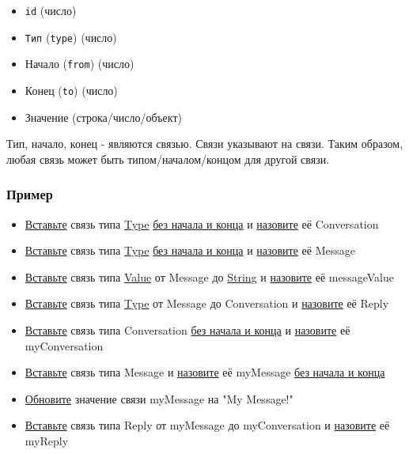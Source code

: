 \documentclass{article}
\begin{document}
\begin{itemize}
      \item \texttt{id} (число)
      \item \texttt{Тип} (\texttt{type}) (число)
      \item Начало (\texttt{from}) (число)
      \item Конец (\texttt{to}) (число)
      \item Значение (строка/число/объект)
\end{itemize}

Тип, начало, конец - являются связью. Связи указывают на связи. Таким образом,
любая связь может быть типом/началом/концом для другой связи.

\subsubsection{Пример}
\begin{itemize}
      \item \hyperlink{DeepCase.InsertLink.Description}{Вставьте} связь типа
            \hyperlink{Core.Type.Description}{Type}
            \hyperlink{FAQ.HowToInsertLinkWithoutFromAndTo}{без
                  начала и конца} и \hyperlink{FAQ.HowToSetName}{назовите} её
            Conversation
      \item \hyperlink{DeepCase.InsertLink.Description}{Вставьте} связь типа
            \hyperlink{Core.Type.Description}{Type}
            \hyperlink{FAQ.HowToInsertLinkWithoutFromAndTo}{без
                  начала и конца} и
            \hyperlink{FAQ.HowToSetName}{назовите} её Message
      \item \hyperlink{DeepCase.InsertLink.Description}{Вставьте} связь типа
            \hyperlink{Core.Value.Description}{Value} от Message до
            \hyperlink{Core.String.Description}{String} и
            \hyperlink{FAQ.HowToSetName}{назовите} её messageValue
      \item \hyperlink{DeepCase.InsertLink.Description}{Вставьте} связь типа
            \hyperlink{Core.Type.Description}{Type} от Message до Conversation
            и
            \hyperlink{FAQ.HowToSetName}{назовите} её Reply
      \item \hyperlink{DeepCase.InsertLink.Description}{Вставьте} связь типа
            Conversation
            \hyperlink{FAQ.HowToInsertLinkWithoutFromAndTo}{без начала и конца} и
            \hyperlink{FAQ.HowToSetName}{назовите} её myConversation
      \item \hyperlink{DeepCase.InsertLink.Description}{Вставьте} связь типа
            Message и \hyperlink{FAQ.HowToSetName}{назовите} её myMessage
            \hyperlink{FAQ.HowToInsertLinkWithoutFromAndTo}{без начала и конца}
      \item \hyperlink{DeepCase.UpdateLink.Description}{Обновите} значение связи
            myMessage на "My Message!"
      \item \hyperlink{DeepCase.InsertLink.Description}{Вставьте} связь типа
            Reply от
            myMessage до myConversation и \hyperlink{FAQ.HowToSetName}{назовите} её
            myReply
\end{itemize}
\end{document}
